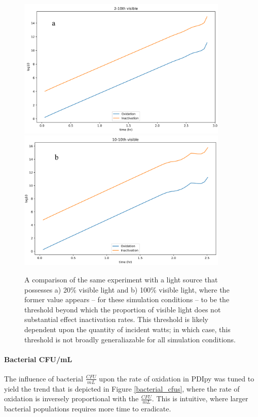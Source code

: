 \begin{figure}
    \centering
    \includegraphics[width = 0.9\textwidth]{images/PDIpy/sensitivity_analyses/light_emission/20_visible.png} \\
    \vspace{5mm}
    \midrule
    \vspace{5mm}
    \includegraphics[width = 0.9\textwidth]{images/PDIpy/sensitivity_analyses/light_emission/100_visible.png}
    \caption{
        A comparison of the same experiment with a light source that possesses a) 20\% visible light and b) 100\% visible light, where the former value appears -- for these simulation conditions -- to be the threshold beyond which the proportion of visible light does not substantial effect inactivation rates. This threshold is likely dependent upon the quantity of incident watts; in which case, this threshold is not broadly generaliazable for all simulation conditions.
    }
    \label{light_emission}
\end{figure}

\paragraph{Bacterial CFU/mL}
The influence of bacterial $\frac{CFU}{mL}$ upon the rate of oxidation in PDIpy was tuned to yield the trend that is depicted in Figure \ref{bacterial_cfus}, where the rate of oxidation is inversely proportional with the $\frac{CFU}{mL}$. This is intuitive, where larger bacterial populations requires more time to eradicate.

